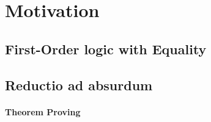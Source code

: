 
\section{Motivation}

\subsection{First-Order logic with Equality}

\begin{frame}
	
\end{frame}

\subsection{Reductio ad absurdum}

\begin{frame}
	\framesubtitle{\FOL{}Theorem Proving}
	
\end{frame}

\begin{frame}
	
\end{frame}

\begin{frame}
	
	\pause
	
\end{frame}

\begin{frame}
	
\end{frame}
	

